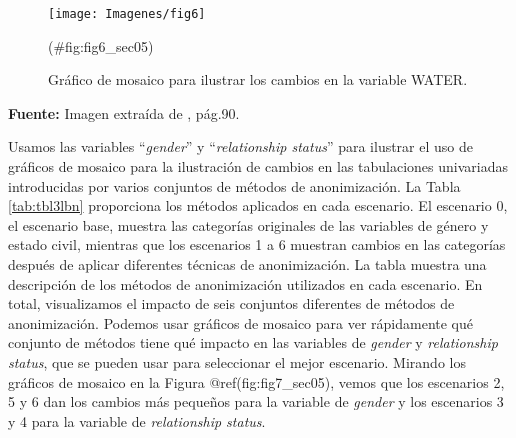 \documentclass[
]{book}
\theoremstyle{definition}
\theoremstyle{definition}
\theoremstyle{definition}
\theoremstyle{definition}
\theoremstyle{remark}
\begin{document}
\begin{figure}

{\centering \texttt{[image: Imagenes/fig6]} 

}

\caption{Gráfico de mosaico para ilustrar los cambios en la variable WATER.}(\#fig:fig6_sec05)
\end{figure}

\textbf{Fuente:} Imagen extraída de \citep{benschop2021}, pág.90.

Usamos las variables ``\emph{gender}'' y ``\emph{relationship status}'' para ilustrar el uso de gráficos de mosaico para la ilustración de cambios en las tabulaciones univariadas introducidas por varios conjuntos de métodos de anonimización. La Tabla \ref{tab:tbl3lbn} proporciona los métodos aplicados en cada escenario. El escenario 0, el escenario base, muestra las categorías originales de las variables de género y estado civil, mientras que los escenarios 1 a 6 muestran cambios en las categorías después de aplicar diferentes técnicas de anonimización. La tabla muestra una descripción de los métodos de anonimización utilizados en cada escenario. En total, visualizamos el impacto de seis conjuntos diferentes de métodos de anonimización. Podemos usar gráficos de mosaico para ver rápidamente qué conjunto de métodos tiene qué impacto en las variables de \emph{gender} y \emph{relationship status}, que se pueden usar para seleccionar el mejor escenario. Mirando los gráficos de mosaico en la Figura @ref(fig:fig7\_sec05), vemos que los escenarios 2, 5 y 6 dan los cambios más pequeños para la variable de \emph{gender} y los escenarios 3 y 4 para la variable de \emph{relationship status}.
\end{document}
